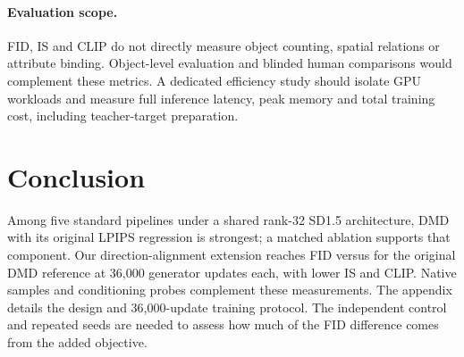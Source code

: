 \documentclass[10pt,twocolumn,letterpaper]{article}
\begin{document}
\paragraph{Evaluation scope.}
FID, IS and CLIP do not directly measure object counting, spatial relations
or attribute binding.
Object-level evaluation and blinded human comparisons would complement
these metrics. A dedicated efficiency study should isolate GPU workloads
and measure full inference latency, peak memory and total training cost,
including teacher-target preparation.

\section{Conclusion}
Among five standard pipelines under a shared rank-32 SD1.5 architecture,
DMD with its original LPIPS regression is strongest; a matched ablation
supports that component. Our direction-alignment extension reaches FID
\ASelectedFID{} versus \ADMDFID{} for the original DMD reference at 36,000
generator updates each, with lower IS and CLIP. Native samples and conditioning
probes complement these measurements. The appendix details the design and
36,000-update training protocol. The independent control and repeated seeds
are needed to assess how much of the FID difference comes from the added objective.

{\small


}
\clearpage
\appendix
\end{document}
